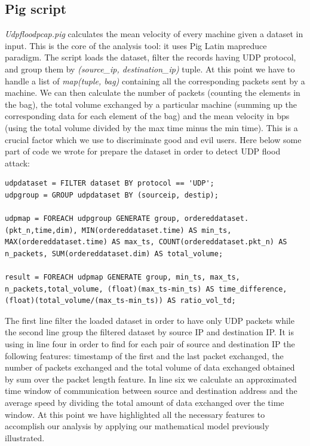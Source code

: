 \subsection{Pig script}
\textit{Udpfloodpcap.pig} calculates the mean velocity of every machine given a dataset in input. 
This is the core of the analysis tool: it uses Pig Latin mapreduce paradigm. 
The script loads the dataset, filter the records having UDP protocol, and group them by \textit{(source\_ip, destination\_ip)} tuple. 
At this point we have to handle a list of \textit{map(tuple, bag)} containing all the corresponding packets sent by a machine. 
We can then calculate the number of packets (counting the elements in the bag), the total volume exchanged by a particular machine (summing up the corresponding data for each element of the bag) and the mean velocity in bps (using the total volume divided by the max time minus the min time). 
This is a crucial factor which we use to discriminate good and evil users. Here below some part of code we wrote for prepare the dataset in order to detect UDP flood attack:


\begin{lstlisting}[numbers=right, columns=flexible, breaklines=true, frame=tb, caption={\textit{Udpfloodpcap.pig} script}, label={lst:udpfloodscript}]
udpdataset = FILTER dataset BY protocol == 'UDP';
udpgroup = GROUP udpdataset BY (sourceip, destip);

udpmap = FOREACH udpgroup GENERATE group, ordereddataset.(pkt_n,time,dim), MIN(ordereddataset.time) AS min_ts, MAX(ordereddataset.time) AS max_ts, COUNT(ordereddataset.pkt_n) AS n_packets, SUM(ordereddataset.dim) AS total_volume;

result = FOREACH udpmap GENERATE group, min_ts, max_ts, n_packets,total_volume, (float)(max_ts-min_ts) AS time_difference, (float)(total_volume/(max_ts-min_ts)) AS ratio_vol_td;

\end{lstlisting}

The first line filter the loaded dataset in order to have only UDP packets while the second line group the filtered dataset by source IP and destination IP. 
It is using in line four in order to find for each pair of source and destination IP the following features: timestamp of the first and the last packet exchanged, the number of packets exchanged and the total volume of data exchanged obtained by sum over the packet length feature. 
In line six we calculate an approximated time window of communication between source and destination address and the average speed by dividing the total amount of data exchanged over the time window.
At this point we have highlighted all the necessary features to accomplish our analysis by applying our mathematical model previously illustrated.










   
